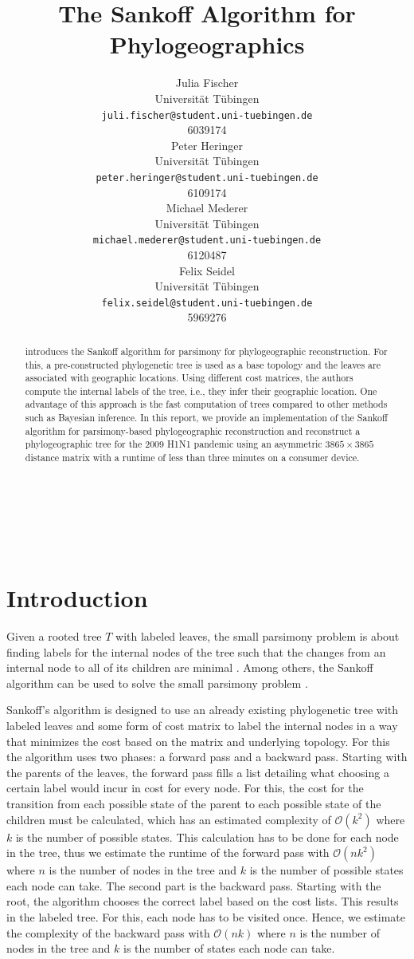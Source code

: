 \documentclass{article}
\title{The Sankoff Algorithm for Phylogeographics}
\author{ Julia Fischer \\
  Universität Tübingen \\
  \texttt{juli.fischer@student.uni-tuebingen.de} \\
  6039174 \\
  \And Peter Heringer \\
  Universität Tübingen \\
  \texttt{peter.heringer@student.uni-tuebingen.de} \\
  6109174 \\
  \And Michael Mederer \\
  Universität Tübingen \\
  \texttt{michael.mederer@student.uni-tuebingen.de} \\
  6120487 \\
  \And Felix Seidel \\
  Universität Tübingen \\
  \texttt{felix.seidel@student.uni-tuebingen.de} \\
  5969276 \\
}
\begin{document}
\maketitle

 \ \\
\begin{abstract}
\cite{reimeringPhylogeographicReconstructionUsing2020} introduces the Sankoff
algorithm for parsimony for phylogeographic reconstruction. For this, a
pre-constructed phylogenetic tree is used as a base topology and the leaves are
associated with geographic locations. Using different cost matrices, the authors
compute the internal labels of the tree, i.e., they infer their geographic
location. One advantage of this approach is the fast computation of trees
compared to other methods such as Bayesian inference. In this report, we provide
an implementation of the Sankoff algorithm for parsimony-based phylogeographic
reconstruction and reconstruct a phylogeographic tree for the 2009 H1N1 pandemic
using an asymmetric $3865 \times 3865$ distance matrix with a runtime of less
than three minutes on a consumer device. 
\end{abstract}

\ \\
\section{Introduction}
Given a rooted tree $T$ with labeled leaves, the small parsimony problem is
about finding labels for the internal nodes of the tree such that the changes
from an internal node to all of its children are minimal
\cite{jonesIntroductionBioinformaticsAlgorithms2004}. Among others, the Sankoff
algorithm can be used to solve the small parsimony problem
\cite{sankoffMinimalMutationTrees1975}. 

Sankoff's algorithm is designed to use an already existing phylogenetic tree
with labeled leaves and some form of cost matrix to label the internal nodes in
a way that minimizes the cost based on the matrix and underlying topology. For
this the algorithm uses two phases: a forward pass and a backward pass. Starting
with the parents of the leaves, the forward pass fills a list detailing what
choosing a certain label would incur in cost for every node. For this, the cost
for the transition from each possible state of the parent to each possible state
of the children must be calculated, which has an estimated complexity of
$\mathcal{O}(k^2)$ where $k$ is the number of possible states. This calculation
has to be done for each node in the tree, thus we estimate the runtime of the
forward pass with $\mathcal{O}(nk^2)$ where $n$ is the number of nodes in the
tree and $k$ is the number of possible states each node can take. The second
part is the backward pass. Starting with the root, the algorithm chooses the
correct label based on the cost lists. This results in the labeled tree. For
this, each node has to be visited once. Hence, we estimate the complexity of the
backward pass with $\mathcal{O}(nk)$ where $n$ is the number of nodes in the
tree and $k$ is the number of states each node can take.
\end{document}
